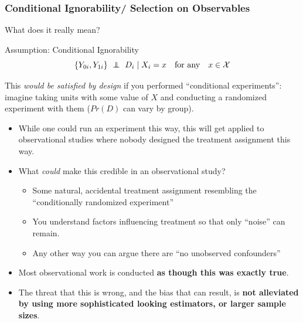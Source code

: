 \documentclass[xcolor=dvipsnames]{beamer}
\newcommand\E{\mathbb{E}}
\newcommand\indep{\protect\mathpalette{\protect\independenT}{\perp}}
\def\independenT#1#2{\mathrel{\rlap{$#1#2$}\mkern2mu{#1#2}}}
\begin{document}
\begin{frame}
\frametitle{Conditional Ignorability/ Selection on Observables}
\small
{} What does it really mean?
\begin{block}{Assumption: Conditional Ignorability}
$$ \{ Y_{0i}, Y_{1i}\} \ \indep \ D_i \mid X_i = x \quad \text{for any} \quad x \in \mathcal{X} $$
\end{block}
\smallskip
\footnotesize
This \textit{would be satisfied by design} if you performed ``conditional experiments'': imagine taking units with some value of $X$ and conducting a randomized experiment with them ($Pr(D)$ can vary by group).
\scriptsize
\begin{itemize} 
\item<2-> While one could run an experiment this way, this will get applied to observational studies where nobody designed the treatment assignment this way.
\item<3-> What \textit{could} make this credible in an observational study?
\begin{itemize}
\scriptsize
\item Some natural, accidental treatment assignment resembling the ``conditionally randomized experiment''
\item You understand factors influencing treatment so that only ``noise'' can remain.
\item Any other way you can argue there are ``no unobserved confounders''
\end{itemize}
\item<4-> Most observational work is conducted \textbf{as though this was exactly true}.
\item<5-> The threat that this is wrong, and the bias that can result, is \textbf{not alleviated by using more sophisticated looking estimators, or larger sample sizes}. 
\end{itemize}
\end{frame}


%
\end{document}
